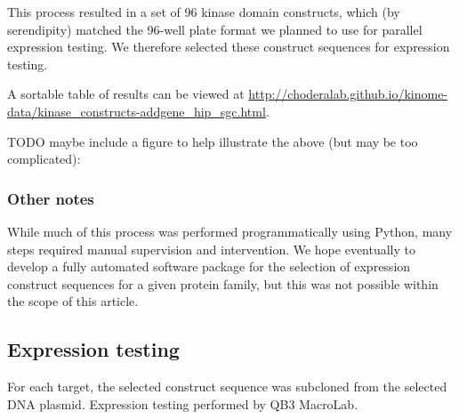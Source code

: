 \documentclass[aps,pre,twocolumn,nofootinbib,superscriptaddress,linenumbers]{revtex4-1}
\begin{document}
This process resulted in a set of 96 kinase domain constructs, which (by serendipity) matched the 96-well plate format we planned to use for parallel expression testing.
We therefore selected these construct sequences for expression testing.

A sortable table of results can be viewed at \url{http://choderalab.github.io/kinome-data/kinase\_constructs-addgene\_hip\_sgc.html}.

{
\color{blue}
TODO maybe include a figure to help illustrate the above (but may be too complicated):
}

\subsubsection{Other notes}

While much of this process was performed programmatically using Python, many steps required manual supervision and intervention.
We hope eventually to develop a fully automated software package for the selection of expression construct sequences for a given protein family, but this was not possible within the scope of this article.

\subsection{Expression testing}


For each target, the selected construct sequence was subcloned from the selected DNA plasmid.
Expression testing performed by QB3 MacroLab.
\end{document}
